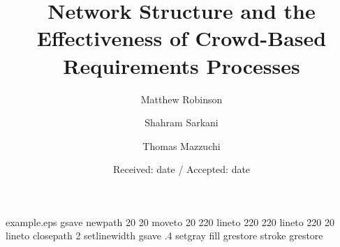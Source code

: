 %
%
%
%
\begin{filecontents*}{example.eps}
gsave
newpath
  20 20 moveto
  20 220 lineto
  220 220 lineto
  220 20 lineto
closepath
2 setlinewidth
gsave
  .4 setgray fill
grestore
stroke
grestore
\end{filecontents*}
%
\RequirePackage{fix-cm}
%
\documentclass{svjour3}                     %
%
\smartqed  %
\usepackage{graphicx}
\usepackage{cite}


\title{Network Structure and the Effectiveness of Crowd-Based Requirements Processes}

\author{Matthew Robinson \and
        Shahram Sarkani \and 
        Thomas Mazzuchi
}


\date{Received: date / Accepted: date}


\maketitle

